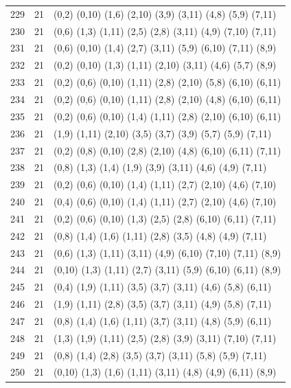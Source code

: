 \begin{appendix}
{\begin{longtable}{lll}
229& 21 & (0,2)   (0,10) (1,6)  (2,10)  (3,9)   (3,11)  (4,8)   (5,9)   (7,11)\\
230& 21 & (0,6)   (1,3)  (1,11) (2,5)   (2,8)   (3,11)  (4,9)   (7,10)  (7,11)\\
231& 21 & (0,6)   (0,10) (1,4)  (2,7)   (3,11)  (5,9)   (6,10)  (7,11)  (8,9)\\
232& 21 & (0,2)   (0,10) (1,3)  (1,11)  (2,10)  (3,11)  (4,6)   (5,7)   (8,9)\\
233& 21 & (0,2)   (0,6)  (0,10) (1,11)  (2,8)   (2,10)  (5,8)   (6,10)  (6,11)\\
234& 21 & (0,2)   (0,6)  (0,10) (1,11)  (2,8)   (2,10)  (4,8)   (6,10)  (6,11)\\
235& 21 & (0,2)   (0,6)  (0,10) (1,4)   (1,11)  (2,8)   (2,10)  (6,10)  (6,11)\\
236& 21 & (1,9)   (1,11) (2,10) (3,5)   (3,7)   (3,9)   (5,7)   (5,9)   (7,11)\\
237& 21 & (0,2)   (0,8)  (0,10) (2,8)   (2,10)  (4,8)   (6,10)  (6,11)  (7,11)\\
238& 21 & (0,8)   (1,3)  (1,4)  (1,9)   (3,9)   (3,11)  (4,6)   (4,9)   (7,11)\\
239& 21 & (0,2)   (0,6)  (0,10) (1,4)   (1,11)  (2,7)   (2,10)  (4,6)   (7,10)\\
240& 21 & (0,4)   (0,6)  (0,10) (1,4)   (1,11)  (2,7)   (2,10)  (4,6)   (7,10)\\
241& 21 & (0,2)   (0,6)  (0,10) (1,3)   (2,5)   (2,8)   (6,10)  (6,11)  (7,11)\\
242& 21 & (0,8)   (1,4)  (1,6)  (1,11)  (2,8)   (3,5)   (4,8)   (4,9)   (7,11)\\
243& 21 & (0,6)   (1,3)  (1,11) (3,11)  (4,9)   (6,10)  (7,10)  (7,11)  (8,9)\\
244& 21 & (0,10)  (1,3)  (1,11) (2,7)   (3,11)  (5,9)   (6,10)  (6,11)  (8,9)\\
245& 21 & (0,4)   (1,9)  (1,11) (3,5)   (3,7)   (3,11)  (4,6)   (5,8)   (6,11)\\
246& 21 & (1,9)   (1,11) (2,8)  (3,5)   (3,7)   (3,11)  (4,9)   (5,8)   (7,11)\\
247& 21 & (0,8)   (1,4)  (1,6)  (1,11)  (3,7)   (3,11)  (4,8)   (5,9)   (6,11)\\
248& 21 & (1,3)   (1,9)  (1,11) (2,5)   (2,8)   (3,9)   (3,11)  (7,10)  (7,11)\\
249& 21 & (0,8)   (1,4)  (2,8)  (3,5)   (3,7)   (3,11)  (5,8)   (5,9)   (7,11)\\
250& 21 & (0,10)  (1,3)  (1,6)  (1,11)  (3,11)  (4,8)   (4,9)   (6,11)  (8,9)\\

\end{longtable}}
\end{appendix}
